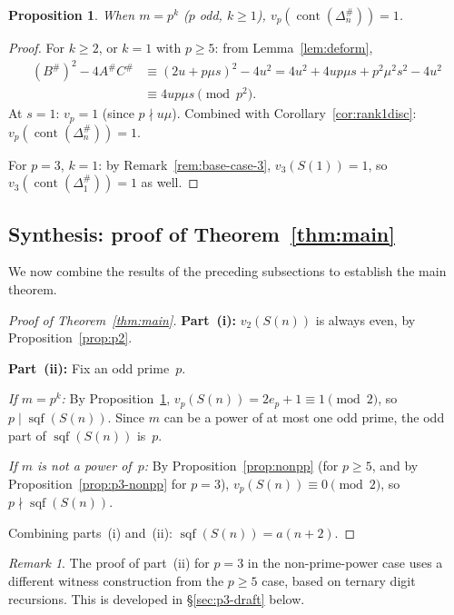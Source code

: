 \documentclass[10pt]{amsart}
\newtheorem{proposition}[theorem]{Proposition}
\theoremstyle{definition}
\theoremstyle{remark}
\newtheorem*{remark}{Remark}
\DeclareMathOperator{\cont}{cont}
\DeclareMathOperator{\sqf}{sqf}
\begin{document}
\begin{proposition}\label{prop:pp}
When $m = p^k$ ($p$ odd, $k \ge 1$),
$v_p(\cont(\Delta_n^{\#})) = 1$.
\end{proposition}

\begin{proof}
For $k \ge 2$, or $k = 1$ with $p \ge 5$:
from Lemma~\ref{lem:deform},
\begin{align*}
(B^{\#})^2 - 4A^{\#}C^{\#}
&\equiv (2u+p\mu s)^2 - 4u^2
= 4u^2 + 4up\mu s + p^2\mu^2 s^2 - 4u^2 \\
&\equiv 4up\mu s \pmod{p^2}.
\end{align*}
At $s=1$: $v_p = 1$ (since $p \nmid u\mu$).
Combined with Corollary~\ref{cor:rank1disc}:
$v_p(\cont(\Delta_n^{\#})) = 1$.

For $p = 3$, $k = 1$: by Remark~\ref{rem:base-case-3},
$v_3(S(1)) = 1$, so $v_3(\cont(\Delta_1^{\#})) = 1$ as well.
\end{proof}

\subsection{Synthesis: proof of Theorem~\ref{thm:main}}\label{subsec:synthesis}

We now combine the results of the preceding subsections to establish
the main theorem.

\begin{proof}[Proof of Theorem~\ref{thm:main}]
\textbf{Part~(i):} $v_2(S(n))$ is always even, by Proposition~\ref{prop:p2}.

\textbf{Part~(ii):}
Fix an odd prime~$p$.

\emph{If $m = p^k$:} By Proposition~\ref{prop:pp},
$v_p(S(n)) = 2e_p + 1 \equiv 1 \pmod{2}$, so $p \mid \sqf(S(n))$.
Since $m$ can be a power of at most one odd prime,
the odd part of $\sqf(S(n))$ is~$p$.

\emph{If $m$ is not a power of~$p$:} By Proposition~\ref{prop:nonpp}
(for $p \ge 5$, and by Proposition~\ref{prop:p3-nonpp} for $p = 3$),
$v_p(S(n)) \equiv 0 \pmod{2}$, so $p \nmid \sqf(S(n))$.

Combining parts~(i) and~(ii): $\sqf(S(n)) = a(n+2)$.
\end{proof}

\begin{remark}
The proof of part~(ii) for $p=3$ in the non-prime-power case uses
a different witness construction from the $p \ge 5$ case, based on
ternary digit recursions.  This is developed in
\S\ref{sec:p3-draft} below.
\end{remark}
\end{document}
